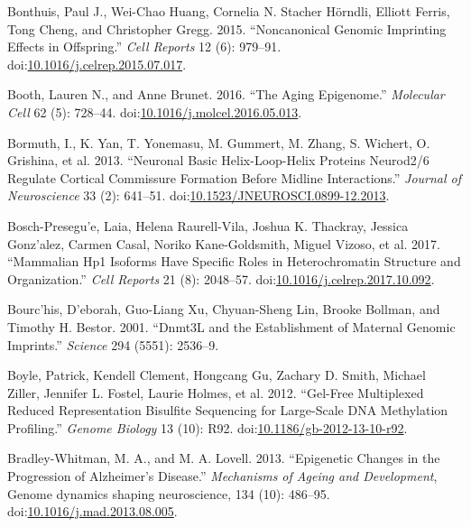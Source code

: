 \documentclass[onehalf,12pt]{beavtex}
\begin{document}
  \hypertarget{ref-BonthuisNoncanonicalGenomicImprinting2015}{}
  Bonthuis, Paul J., Wei-Chao Huang, Cornelia N. Stacher Hörndli, Elliott
  Ferris, Tong Cheng, and Christopher Gregg. 2015. ``Noncanonical Genomic
  Imprinting Effects in Offspring.'' \emph{Cell Reports} 12 (6): 979--91.
  doi:\href{https://doi.org/10.1016/j.celrep.2015.07.017}{10.1016/j.celrep.2015.07.017}.
  
  \hypertarget{ref-BoothAgingEpigenome2016a}{}
  Booth, Lauren N., and Anne Brunet. 2016. ``The Aging Epigenome.''
  \emph{Molecular Cell} 62 (5): 728--44.
  doi:\href{https://doi.org/10.1016/j.molcel.2016.05.013}{10.1016/j.molcel.2016.05.013}.
  
  \hypertarget{ref-BormuthNeuronalBasicHelixLoopHelix2013a}{}
  Bormuth, I., K. Yan, T. Yonemasu, M. Gummert, M. Zhang, S. Wichert, O.
  Grishina, et al. 2013. ``Neuronal Basic Helix-Loop-Helix Proteins
  Neurod2/6 Regulate Cortical Commissure Formation Before Midline
  Interactions.'' \emph{Journal of Neuroscience} 33 (2): 641--51.
  doi:\href{https://doi.org/10.1523/JNEUROSCI.0899-12.2013}{10.1523/JNEUROSCI.0899-12.2013}.
  
  \hypertarget{ref-Bosch-PresegueMammalianHP1Isoforms2017}{}
  Bosch-Presegu\a'e, Laia, Helena Raurell-Vila, Joshua K. Thackray,
  Jessica Gonz\a'alez, Carmen Casal, Noriko Kane-Goldsmith, Miguel Vizoso,
  et al. 2017. ``Mammalian Hp1 Isoforms Have Specific Roles in
  Heterochromatin Structure and Organization.'' \emph{Cell Reports} 21
  (8): 2048--57.
  doi:\href{https://doi.org/10.1016/j.celrep.2017.10.092}{10.1016/j.celrep.2017.10.092}.
  
  \hypertarget{ref-BourchisDnmt3Lestablishmentmaternal2001}{}
  Bourc'his, D\a'eborah, Guo-Liang Xu, Chyuan-Sheng Lin, Brooke Bollman,
  and Timothy H. Bestor. 2001. ``Dnmt3L and the Establishment of Maternal
  Genomic Imprints.'' \emph{Science} 294 (5551): 2536--9.
  
  \hypertarget{ref-BoyleGelfreemultiplexedreduced2012}{}
  Boyle, Patrick, Kendell Clement, Hongcang Gu, Zachary D. Smith, Michael
  Ziller, Jennifer L. Fostel, Laurie Holmes, et al. 2012. ``Gel-Free
  Multiplexed Reduced Representation Bisulfite Sequencing for Large-Scale
  DNA Methylation Profiling.'' \emph{Genome Biology} 13 (10): R92.
  doi:\href{https://doi.org/10.1186/gb-2012-13-10-r92}{10.1186/gb-2012-13-10-r92}.
  
  \hypertarget{ref-Bradley-WhitmanEpigeneticchangesprogression2013}{}
  Bradley-Whitman, M. A., and M. A. Lovell. 2013. ``Epigenetic Changes in
  the Progression of Alzheimer's Disease.'' \emph{Mechanisms of Ageing and
  Development}, Genome dynamics shaping neuroscience, 134 (10): 486--95.
  doi:\href{https://doi.org/10.1016/j.mad.2013.08.005}{10.1016/j.mad.2013.08.005}.
  
\end{document}

